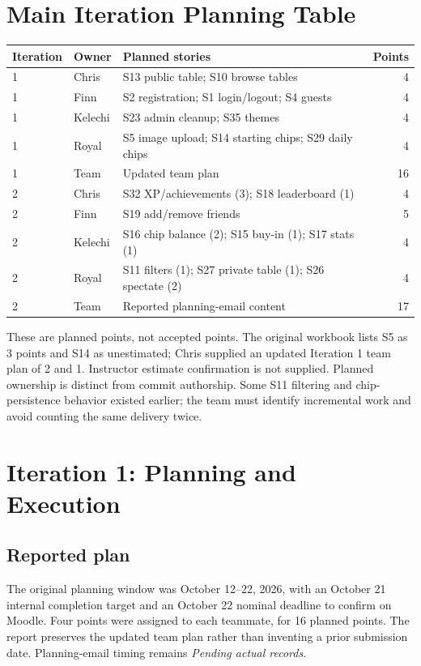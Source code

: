 \documentclass[11pt,a4paper]{article}
\newcommand{\pending}{\textit{Pending actual records}}
\begin{document}
\section{Main Iteration Planning Table}
\begin{tabularx}{\textwidth}{@{}l l X r@{}}
\toprule Iteration & Owner & Planned stories & Points\\\midrule
1 & Chris & S13 public table; S10 browse tables & 4\\
1 & Finn & S2 registration; S1 login/logout; S4 guests & 4\\
1 & Kelechi & S23 admin cleanup; S35 themes & 4\\
1 & Royal & S5 image upload; S14 starting chips; S29 daily chips & 4\\
\midrule 1 & Team & Updated team plan & 16\\\midrule
2 & Chris & S32 XP/achievements (3); S18 leaderboard (1) & 4\\
2 & Finn & S19 add/remove friends & 5\\
2 & Kelechi & S16 chip balance (2); S15 buy-in (1); S17 stats (1) & 4\\
2 & Royal & S11 filters (1); S27 private table (1); S26 spectate (2) & 4\\
\midrule 2 & Team & Reported planning-email content & 17\\\bottomrule
\end{tabularx}

These are planned points, not accepted points. The original workbook lists S5 as 3 points and S14 as unestimated; Chris supplied an updated Iteration 1 team plan of 2 and 1. Instructor estimate confirmation is not supplied. Planned ownership is distinct from commit authorship. Some S11 filtering and chip-persistence behavior existed earlier; the team must identify incremental work and avoid counting the same delivery twice.

\section{Iteration 1: Planning and Execution}
\subsection{Reported plan}
The original planning window was October 12--22, 2026, with an October 21 internal completion target and an October 22 nominal deadline to confirm on Moodle. Four points were assigned to each teammate, for 16 planned points. The report preserves the updated team plan rather than inventing a prior submission date. Planning-email timing remains \pending.
\end{document}
